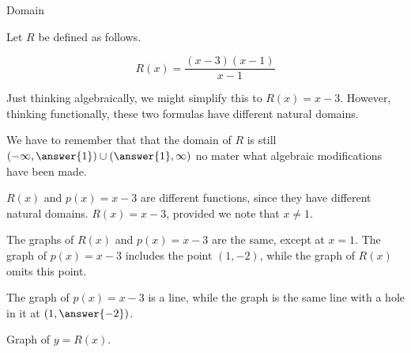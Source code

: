 \documentclass{ximera}
\begin{document}
\begin{example} Domain

Let $R$ be defined as follows.


\[   R(x) = \frac{(x-3)(x-1)}{x-1}            \]


Just thinking algebraically, we might simplify this to $R(x) = x-3$. However, thinking functionally, these two formulas have different natural domains.


We have to remember that that the domain of $R$ is still $\left( -\infty, \answer{1} \right) \cup \left( \answer{1},\infty \right)$ no mater what algebraic modifications have been made.

$R(x)$ and $p(x) = x-3$ are different functions, since they have different natural domains. $R(x) = x - 3$, provided we note that $x \ne 1$.


The graphs of $R(x)$ and $p(x) = x-3$ are the same, except at $x=1$.  The graph of $p(x) = x-3$ includes the point $(1, -2)$, while the graph of $R(x)$ omits this point.



The graph of $p(x) = x-3$ is a line, while the graph is the same line with a hole in it at $\left( 1, \answer{-2} \right)$.












Graph of $y = R(x)$.


\begin{image}
\end{image}
\end{example}
\end{document}
